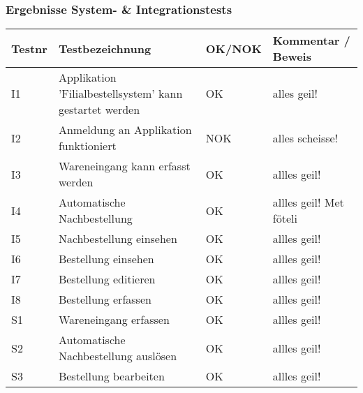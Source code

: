 \subsubsection{Ergebnisse System- \& Integrationstests}
\begin{tabular}{|l|l|l|l|}
	\hline \rowcolor{gray!50}
	Testnr & Testbezeichnung & OK/NOK & Kommentar / Beweis \\ 
	\hline 
	I1 & Applikation 'Filialbestellsystem' kann gestartet werden & OK & alles geil! \\ 
	\hline 
	I2 & Anmeldung an Applikation funktioniert & NOK & alles scheisse! \\ 
	\hline 
	I3 & Wareneingang kann erfasst werden & OK & allles geil! \\ 
	\hline 
	I4 & Automatische Nachbestellung & OK & allles geil! Met föteli\\ 
	\hline 
	I5 & Nachbestellung einsehen & OK & allles geil! \\ 
	\hline 
	I6 & Bestellung einsehen & OK & allles geil! \\ 
	\hline
	I7 & Bestellung editieren & OK & allles geil! \\ 
	\hline  
	I8 & Bestellung erfassen & OK & allles geil! \\ 
	\hline 
	S1 & Wareneingang erfassen & OK & allles geil! \\ 
	\hline 
	S2 & Automatische Nachbestellung auslösen & OK & allles geil! \\ 
	\hline 
	S3 & Bestellung bearbeiten & OK & allles geil! \\ 
	\hline 
\end{tabular} 
\clearpage
